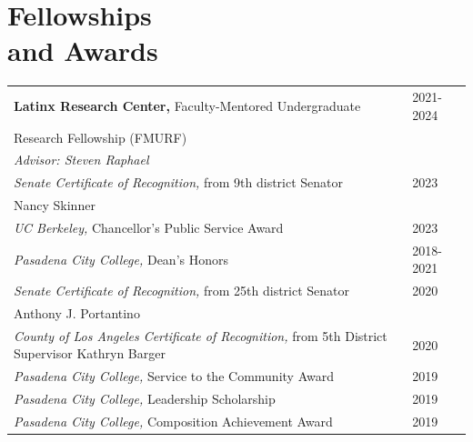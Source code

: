 \section{\sc Fellowships \\ and Awards}

\begin{tabular}{@{}p{4.25in}p{2in}}


\textbf{Latinx Research Center,} Faculty-Mentored Undergraduate & 2021-2024 \\ Research Fellowship (FMURF)   \\
\textit{Advisor: Steven Raphael}  \\

\textit{Senate Certificate of Recognition,} from 9th district Senator & 2023 \\ Nancy Skinner \\

\textit{UC Berkeley,} Chancellor{'}s Public Service Award & 2023 \\

\textit{Pasadena City College,} Dean{'}s Honors & 2018-2021 \\

\textit{Senate Certificate of Recognition,} from 25th district Senator & 2020 \\ Anthony J. Portantino \\

\textit{County of Los Angeles Certificate of Recognition,} from 5th District Supervisor Kathryn Barger & 2020 \\

\textit{Pasadena City College,} Service to the Community
Award & 2019 \\
\textit{Pasadena City College,} Leadership Scholarship & 2019 \\
\textit{Pasadena City College,} Composition Achievement Award & 2019
\end{tabular}
\endinput

